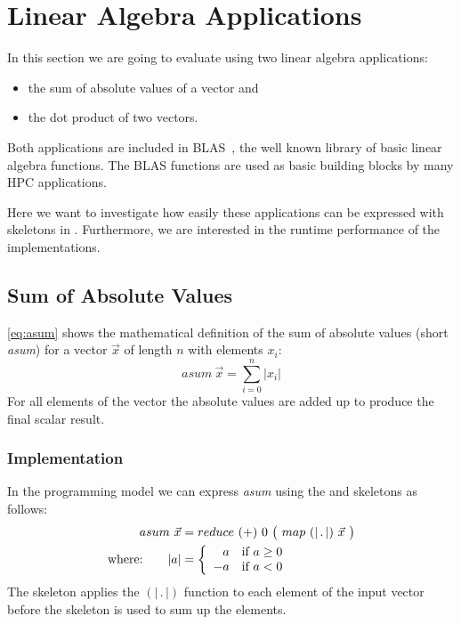 \section{Linear Algebra Applications}
\label{section:skelcl:evaluation:linearAlgebra}

In this section we are going to evaluate \SkelCL using two linear algebra applications:
\begin{itemize}
  \item the sum of absolute values of a vector and
  \item the dot product of two vectors.
\end{itemize}

Both applications are included in BLAS~\cite{Dongarra2002,Dongarra2002a}, the well known library of basic linear algebra functions.
The BLAS functions are used as basic building blocks by many HPC applications.

Here we want to investigate how easily these applications can be expressed with skeletons in \SkelCL.
Furthermore, we are interested in the runtime performance of the \SkelCL implementations.

\subsection*{Sum of Absolute Values}
\label{sec:asum}
\autoref{eq:asum} shows the mathematical definition of the sum of absolute values (short \emph{asum}) for a vector $\vec{x}$ of length $n$ with elements $x_i$:
\begin{equation}
  asum\ \vec{x} = \sum_{i=0}^{n} | x_i |
  \label{eq:asum}
\end{equation}
For all elements of the vector the absolute values are added up to produce the final scalar result.

\subsubsection*{\SkelCL Implementation}
In the \SkelCL programming model we can express \emph{asum} using the \map and \reduce skeletons as follows:
\begin{align}
  asum\ \vec{x} &= reduce\ (+)\ 0\ \big(\ map\ (|\, .\, |)\ \vec{x}\ \big)\label{eq:asum:skelcl}\\
  \text{where:} \qquad | a | &=
    \left\{
      \begin{array}{r l}
      a & \text{if } a \geq 0\\
      -a & \text{if } a < 0
      \end{array}
    \right.\nonumber
\end{align}
The \map skeleton applies the $(|\, .\, |)$ function to each element of the input vector before the \reduce skeleton is used to sum up the elements.

